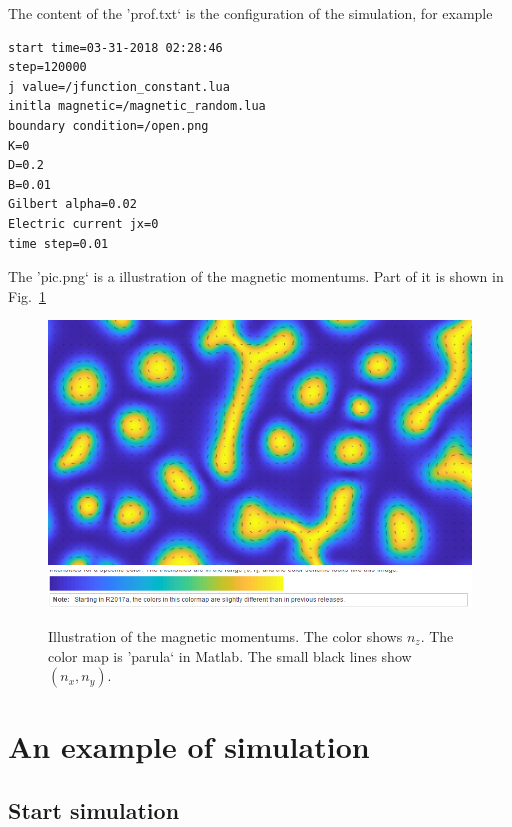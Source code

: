 \documentclass[aps,superscriptaddress,groupedaddress]{revtex4}  %
\begin{document}
The content of the 'prof.txt` is the configuration of the simulation, for example
\begin{lstlisting}
start time=03-31-2018 02:28:46
step=120000
j value=/jfunction_constant.lua
initla magnetic=/magnetic_random.lua
boundary condition=/open.png
K=0
D=0.2
B=0.01
Gilbert alpha=0.02
Electric current jx=0
time step=0.01
\end{lstlisting}

The 'pic.png` is a illustration of the magnetic momentums. Part of it is shown in Fig.~\ref{Fig:output2}
\begin{figure}
\includegraphics[scale=0.3]{output2.png}
\includegraphics[scale=0.5]{parula.png}
\caption{\label{Fig:output2}Illustration of the magnetic momentums. The color shows $n_z$. The color map is 'parula` in Matlab. The small black lines show $(n_x,n_y)$.}
\end{figure}

\section{\label{sec:6}An example of simulation}

\subsection{\label{sec:6.1}Start simulation}
\end{document}
